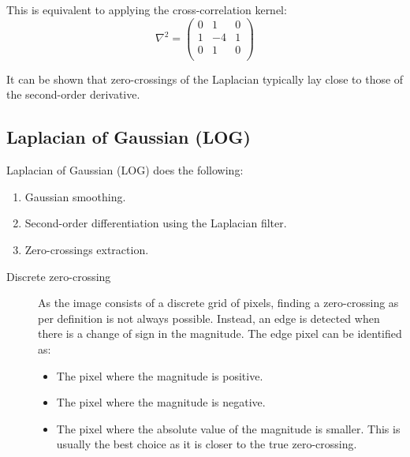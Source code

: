 \begin{description}
        This is equivalent to applying the cross-correlation kernel:
        \[
            \nabla^2 = \begin{pmatrix}
                0 & 1 & 0 \\
                1 & -4 & 1 \\
                0 & 1 & 0 \\
            \end{pmatrix}    
        \]

        \begin{remark}
            It can be shown that zero-crossings of the Laplacian typically lay close to those of the second-order derivative.
        \end{remark}
\end{description}


\subsection{Laplacian of Gaussian (LOG)}

Laplacian of Gaussian (LOG) does the following: 
\begin{enumerate}
    \item Gaussian smoothing.
    \item Second-order differentiation using the Laplacian filter.
    \item Zero-crossings extraction.
\end{enumerate}

\begin{description}
    \item[Discrete zero-crossing]
        As the image consists of a discrete grid of pixels, finding a zero-crossing as per definition is not always possible.
        Instead, an edge is detected when there is a change of sign in the magnitude.
        The edge pixel can be identified as:
        \begin{itemize}
            \item The pixel where the magnitude is positive.
            \item The pixel where the magnitude is negative.
            \item The pixel where the absolute value of the magnitude is smaller. 
                This is usually the best choice as it is closer to the true zero-crossing.
        \end{itemize}
\end{description}

